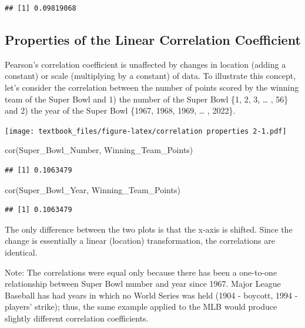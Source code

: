 \documentclass[
  11pt,
]{book}
\newenvironment{Shaded}{\begin{snugshade}}{\end{snugshade}}
\newcommand{\FunctionTok}[1]{\textcolor[rgb]{0.00,0.00,0.00}{#1}}
\newcommand{\NormalTok}[1]{#1}
\theoremstyle{definition}
\theoremstyle{definition}
\theoremstyle{definition}
\theoremstyle{definition}
\theoremstyle{remark}
\begin{document}
\begin{verbatim}
## [1] 0.09819068
\end{verbatim}

\newpage

\hypertarget{properties-of-the-linear-correlation-coefficient}{%
\subsection{Properties of the Linear Correlation Coefficient}\label{properties-of-the-linear-correlation-coefficient}}

Pearson's correlation coefficient is unaffected by changes in location (adding a constant) or scale (multiplying by a constant) of data. To illustrate this concept, let's consider the correlation between the number of points scored by the winning team of the Super Bowl and 1) the number of the Super Bowl \{1, 2, 3, \ldots{} , 56\} and 2) the year of the Super Bowl \{1967, 1968, 1969, \ldots{} , 2022\}.

\texttt{[image: textbook\_files/figure-latex/correlation properties 2-1.pdf]}

\begin{Shaded}
\begin{Highlighting}[]
\FunctionTok{cor}\NormalTok{(Super\_Bowl\_Number, Winning\_Team\_Points)}
\end{Highlighting}
\end{Shaded}

\begin{verbatim}
## [1] 0.1063479
\end{verbatim}

\begin{Shaded}
\begin{Highlighting}[]
\FunctionTok{cor}\NormalTok{(Super\_Bowl\_Year, Winning\_Team\_Points)}
\end{Highlighting}
\end{Shaded}

\begin{verbatim}
## [1] 0.1063479
\end{verbatim}

The only difference between the two plots is that the x-axis is shifted. Since the change is essentially a linear (location) transformation, the correlations are identical.

Note: The correlations were equal only because there has been a one-to-one relationship between Super Bowl number and year since 1967. Major League Baseball has had years in which no World Series was held (1904 - boycott, 1994 - players' strike); thus, the same example applied to the MLB would produce slightly different correlation coefficients.
\end{document}

